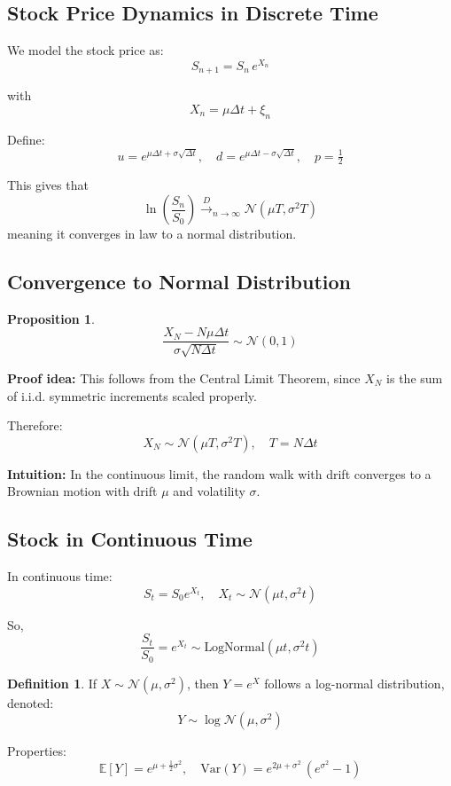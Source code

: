 \documentclass[12pt,a4paper]{article}
\theoremstyle{definition}
\newtheorem{definition}{Definition}[section]
\newtheorem{proposition}{Proposition}[section]
\begin{document}
\subsection{Stock Price Dynamics in Discrete Time}

We model the stock price as:
\[
S_{n+1} = S_n \, e^{X_n}
\]

with
\[
X_n = \mu \Delta t + \xi_n
\]

Define:
\[
u = e^{\mu \Delta t + \sigma \sqrt{\Delta t}}, \quad
d = e^{\mu \Delta t - \sigma \sqrt{\Delta t}}, \quad
p = \tfrac{1}{2}
\]

This gives that 
\[
\ln\left(\frac{S_n}{S_0}\right) \xrightarrow{D}_{n\to\infty} \mathcal{N}(\mu T, \sigma^2 T)
\]
meaning it converges in law to a normal distribution.

\subsection{Convergence to Normal Distribution}

\begin{proposition}
\[
\frac{X_N - N\mu \Delta t}{\sigma \sqrt{N \Delta t}} \sim \mathcal{N}(0,1)
\]
\end{proposition}

\textbf{Proof idea:} This follows from the Central Limit Theorem, since $X_N$ is the sum of i.i.d. symmetric increments scaled properly.

Therefore:
\[
X_N \sim \mathcal{N}(\mu T, \sigma^2 T), \quad T = N \Delta t
\]

\textbf{Intuition:} In the continuous limit, the random walk with drift converges to a Brownian motion with drift $\mu$ and volatility $\sigma$.

\subsection{Stock in Continuous Time}

In continuous time:
\[
S_t = S_0 e^{X_t}, \quad X_t \sim \mathcal{N}(\mu t, \sigma^2 t)
\]

So,
\[
\frac{S_t}{S_0} = e^{X_t} \sim \text{LogNormal}(\mu t, \sigma^2 t)
\]

\begin{definition}
If $X \sim \mathcal{N}(\mu, \sigma^2)$, then $Y = e^X$ follows a log-normal distribution, denoted:
\[
Y \sim \log\mathcal{N}(\mu, \sigma^2)
\]
\end{definition}

Properties:
\[
\mathbb{E}[Y] = e^{\mu + \frac{1}{2}\sigma^2}, \quad
\text{Var}(Y) = e^{2\mu + \sigma^2}\,(e^{\sigma^2} - 1)
\]
\end{document}
